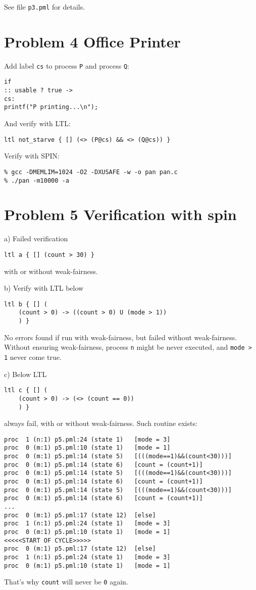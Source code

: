 \documentclass{ctexart}
\begin{document}
See file \lstinline|p3.pml| for details.

\section*{Problem 4 Office Printer}

Add label \lstinline|cs| to process \lstinline|P| and process \lstinline|Q|:
\begin{lstlisting}[frame=single]
if
:: usable ? true ->
cs:
printf("P printing...\n");
\end{lstlisting}

And verify with LTL:
\begin{lstlisting}[frame=single]
ltl not_starve { [] (<> (P@cs) && <> (Q@cs)) }
\end{lstlisting}

Verify with SPIN:
\begin{lstlisting}[frame=single]
% spin -a $<
% gcc -DMEMLIM=1024 -O2 -DXUSAFE -w -o pan pan.c
% ./pan -m10000 -a
\end{lstlisting}

\section*{Problem 5 Verification with spin}

a) Failed verification
\begin{lstlisting}[frame=single]
ltl a { [] (count > 30) }
\end{lstlisting}
with or without weak-fairness.

b) Verify with LTL below
\begin{lstlisting}[frame=single]
ltl b { [] (
	(count > 0) -> ((count > 0) U (mode > 1))
	) }
\end{lstlisting}
No errors found if run with weak-fairness, but failed without weak-fairness. Without ensuring weak-fairness, process \lstinline|n| might be never executed, and \lstinline|mode > 1| never come true.

c) Below LTL
\begin{lstlisting}[frame=single]
ltl c { [] (
	(count > 0) -> (<> (count == 0))
	) }
\end{lstlisting}
always fail, with or without weak-fairness. Such routine exists:
\begin{lstlisting}[frame=single]
proc  1 (n:1) p5.pml:24 (state 1)	[mode = 3]
proc  0 (m:1) p5.pml:10 (state 1)	[mode = 1]
proc  0 (m:1) p5.pml:14 (state 5)	[(((mode==1)&&(count<30)))]
proc  0 (m:1) p5.pml:14 (state 6)	[count = (count+1)]
proc  0 (m:1) p5.pml:14 (state 5)	[(((mode==1)&&(count<30)))]
proc  0 (m:1) p5.pml:14 (state 6)	[count = (count+1)]
proc  0 (m:1) p5.pml:14 (state 5)	[(((mode==1)&&(count<30)))]
proc  0 (m:1) p5.pml:14 (state 6)	[count = (count+1)]
...
proc  0 (m:1) p5.pml:17 (state 12)	[else]
proc  1 (n:1) p5.pml:24 (state 1)	[mode = 3]
proc  0 (m:1) p5.pml:10 (state 1)	[mode = 1]
<<<<<START OF CYCLE>>>>>
proc  0 (m:1) p5.pml:17 (state 12)	[else]
proc  1 (n:1) p5.pml:24 (state 1)	[mode = 3]
proc  0 (m:1) p5.pml:10 (state 1)	[mode = 1]
\end{lstlisting}
That's why \lstinline|count| will never be \lstinline|0| again.
\end{document}
